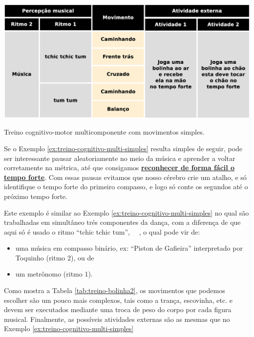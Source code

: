 \begin{table}[!h]
  \centering
    \includegraphics[width=1.0\textwidth]{chapters/cap-body-control/treino-bolinha1.eps}
\caption{Treino cognitivo-motor multicomponente com movimentos simples.}
\label{tab:treino-bolinha1}
\end{table}


Se o Exemplo \ref{ex:treino-cognitivo-multi-simples} resulta simples de seguir, 
pode ser interessante pausar aleatoriamente no meio da música e 
aprender a voltar corretamente na métrica,
até que consigamos \hyperref[subsec:perceberTF1]{\textbf{reconhecer de forma fácil o tempo forte}}.
Com essas pausas evitamos que nosso cérebro crie um atalho,
e só identifique o tempo forte do primeiro compasso, e 
logo só conte os segundos até o próximo tempo forte.



\begin{example}
Este exemplo é similar ao Exemplo \ref{ex:treino-cognitivo-multi-simples}
no qual são trabalhadas em simultâneo trés componentes da dança,
com a diferença de que aqui só é usado o ritmo ``tchic tchic tum'', 
\leftrepeat~\Vier\Acht\Acht~\rightrepeat,
o qual pode vir de: 
    \begin{itemize}
    \item uma música em compasso binário, ex: ``Piston de Gafieira'' interpretado por Toquinho (ritmo 2), ou de 
    \item um metrônomo (ritmo 1).
    \end{itemize}
Como mostra a Tabela \ref{tab:treino-bolinha2}, 
os movimentos que podemos escolher são um pouco mais complexos,
tais como a trança, escovinha, etc. 
e devem ser executados mediante uma troca de peso do corpo por cada figura musical.
Finalmente, as possíveis atividades externas são as mesmas que no 
Exemplo \ref{ex:treino-cognitivo-multi-simples}
\end{example}

